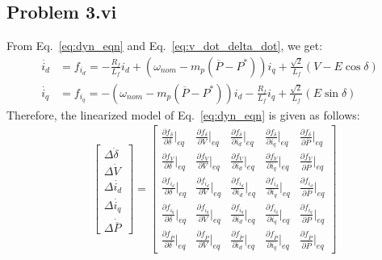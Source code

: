 \subsection*{Problem 3.vi}
From Eq.~\ref{eq:dyn_eqn} and Eq.~\ref{eq:v_dot_delta_dot}, we get:
\begin{align*}
	\dot{i_d} &= f_{i_d} = -\frac{R_f}{L_f}i_d + \left(\omega_{nom}-m_p(\overline{P}-P^*)\right)i_q+\frac{\sqrt{2}}{L_f}(V-E\cos\delta)\\
	\dot{i_q} &= f_{i_q} = -\left(\omega_{nom}-m_p(\overline{P}-P^*)\right)i_d - \frac{R_f}{L_f}i_q+\frac{\sqrt{2}}{L_f}(E\sin\delta)
\end{align*}
Therefore, the linearized model of Eq.~\ref{eq:dyn_eqn} is given as follows:
\begin{align*}
	&\begin{bmatrix}
		\Delta\dot{\delta}\\\Delta\dot{V}\\\Delta\dot{i_d}\\\Delta\dot{i_q}\\\Delta\dot{\overline{P}}
	\end{bmatrix} = \begin{bmatrix}
		\frac{\partial f_{\delta}}{\partial \delta}\Big\rvert_{eq} & \frac{\partial f_{\delta}}{\partial V}\Big\rvert_{eq} & \frac{\partial f_{\delta}}{\partial i_d}\Big\rvert_{eq} & \frac{\partial f_{\delta}}{\partial i_q}\Big\rvert_{eq} & \frac{\partial f_{\delta}}{\partial \overline{P}}\Big\rvert_{eq}\\
		\frac{\partial f_{V}}{\partial \delta}\Big\rvert_{eq} & 		\frac{\partial f_{V}}{\partial V}\Big\rvert_{eq} & 		\frac{\partial f_{V}}{\partial i_d}\Big\rvert_{eq} & 		\frac{\partial f_{V}}{\partial i_q}\Big\rvert_{eq} & 		\frac{\partial f_{V}}{\partial \overline{P}}\Big\rvert_{eq}\\
		\frac{\partial f_{i_d}}{\partial \delta}\Big\rvert_{eq} & 		\frac{\partial f_{i_d}}{\partial V}\Big\rvert_{eq} & 		\frac{\partial f_{i_d}}{\partial i_d}\Big\rvert_{eq} & 		\frac{\partial f_{i_d}}{\partial i_q}\Big\rvert_{eq} & 		\frac{\partial f_{i_d}}{\partial \overline{P}}\Big\rvert_{eq}\\
		\frac{\partial f_{i_q}}{\partial \delta}\Big\rvert_{eq} & 		\frac{\partial f_{i_q}}{\partial V}\Big\rvert_{eq} & 		\frac{\partial f_{i_q}}{\partial i_d}\Big\rvert_{eq} & 		\frac{\partial f_{i_q}}{\partial i_q}\Big\rvert_{eq} & 		\frac{\partial f_{i_q}}{\partial \overline{P}}\Big\rvert_{eq}\\
		\frac{\partial f_{\overline{P}}}{\partial \delta}\Big\rvert_{eq} & \frac{\partial f_{\overline{P}}}{\partial V}\Big\rvert_{eq} & \frac{\partial f_{\overline{P}}}{\partial i_d}\Big\rvert_{eq} & \frac{\partial f_{\overline{P}}}{\partial i_q}\Big\rvert_{eq} & \frac{\partial f_{\overline{P}}}{\partial \overline{P}}\Big\rvert_{eq}

\end{bmatrix}
\end{align*}
